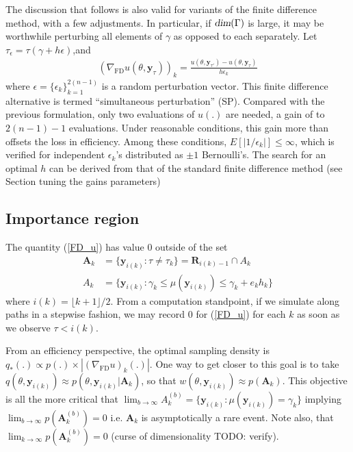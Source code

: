 \documentclass[11pt]{article}
\begin{document}
The discussion that follows is also valid for variants of the finite
difference method, with a few adjustments. In particular, if
$\textsl{dim}(\Gamma)$ is large, it may be worthwhile perturbing all
elements of $\gamma$ as opposed to each separately. Let
$\tau_\epsilon=\tau(\gamma+h \epsilon)$,and
\begin{align}\label{FD_u_SP}
(\nabla_\mathrm{\scriptscriptstyle FD}
u(\theta,\mathbf{y}_{\tau}))_k
=\frac{u(\theta,\mathbf{y}_{\tau'})-u(\theta,\mathbf{y}_{\tau})}{h
\epsilon_k}
\end{align}where $\epsilon=\{\epsilon_k\}_{k=1}^{2(n-1)}$ is a random
perturbation vector. This finite difference alternative is termed
``simultaneous perturbation'' (SP). Compared with the previous
formulation, only two evaluations of $u(.)$ are needed, a gain of to
$2(n-1)-1$ evaluations. Under reasonable conditions, this gain more
than offsets the loss in efficiency. Among these conditions,
$E[|1/\epsilon_k|]\leq \infty$, which is verified for independent
$\epsilon_k$'s distributed as $\pm 1$ Bernoulli's. The search for an
optimal $h$ can be derived from that of the standard finite
difference method (see Section tuning the gains parameters)
\subsection{Importance region}
The quantity (\ref{FD_u}) has value $0$ outside of the set
\begin{align}
\label{region_A}
\mathbf{A}_k &= \{\mathbf{y}_{i(k)}: \tau \neq \tau_k\}=\mathbf{R}_{i(k)-1}\cap A_k\\
A_k &=\{\mathbf{y}_{i(k)}:\gamma_k\leq
\mu(\mathbf{y}_{i(k)})\leq\gamma_k+e_k h_k\}\end{align}where
$i(k)=\lfloor k+1\rfloor/2$.
From a computation standpoint, if we simulate along paths in a
stepwise fashion, we may record $0$ for (\ref{FD_u}) for each $k$ as
soon as we observe $\tau<i(k)$.

From an efficiency perspective, the optimal sampling density is
$q_*(.)\propto p(.) \times |(\nabla_{\mathrm{\scriptscriptstyle FD}}
u)_k(.)|$. One way to get closer to this goal is to take
$q(\theta,\mathbf{y}_{i(k)})\approx
p(\theta,\mathbf{y}_{i(k)}|\mathbf{A}_k)$, so that
$w(\theta,\mathbf{y}_{i(k)})\approx p(\mathbf{A}_k)$. This objective
is all the more critical that $\lim_{b\rightarrow\infty} A_k^{(b)} =
\{\mathbf{y}_{i(k)}:\mu(\mathbf{y}_{i(k)})=\gamma_k\}$ implying
$\lim_{b\rightarrow\infty}p(\mathbf{A}_k^{(b)})=0$ i.e.
$\mathbf{A}_k$ is asymptotically a rare event. Note also, that
$\lim_{k\rightarrow\infty}p(\mathbf{A}_k^{(b)})=0$ (curse of
dimensionality TODO: verify).
\end{document}
